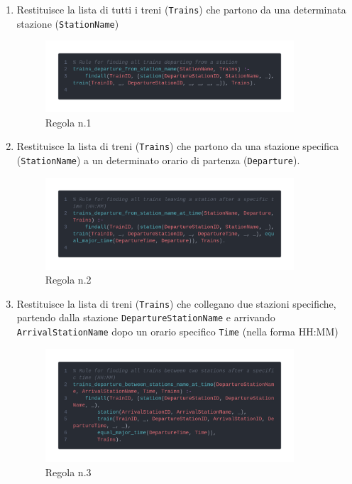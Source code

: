 \documentclass[italian,12pt,a4paper]{article}
\begin{document}
	\begin{enumerate}
		\item Restituisce la lista di tutti i treni (\texttt{Trains}) che partono da una determinata stazione (\texttt{StationName})
			\begin{figure}[h]
				\centering
				\includegraphics[width=350px]{img/code1}
				\caption{Regola n.1}
			\end{figure}
			
		\item Restituisce la lista di treni (\texttt{Trains}) che partono da una stazione specifica (\texttt{StationName}) a un determinato orario di partenza (\texttt{Departure}). 
			\begin{figure}[h]
				\centering
				\includegraphics[width=350px]{img/code2}
				\caption{Regola n.2}

			\end{figure}
			\newpage
		\item Restituisce la lista di treni (\texttt{Trains}) che collegano due stazioni specifiche, partendo dalla stazione \texttt{DepartureStationName} e arrivando \texttt{ArrivalStationName} dopo un orario specifico \texttt{Time} (nella forma HH:MM)
			\begin{figure}[h]
				\centering
				\includegraphics[width=350px]{img/code4}
				\caption{Regola n.3}


\end{figure}
\end{enumerate}
\end{document}
